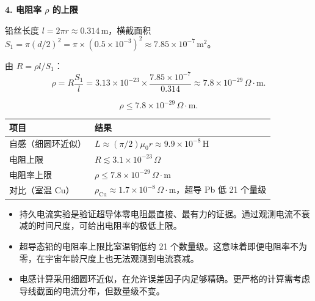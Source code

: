 \begin{derivationbox}[标准解题过程]
\textbf{4. 电阻率 $\rho$ 的上限}

铅丝长度 $l=2\pi r\approx0.314\,\text{m}$，横截面积 $S_1=\pi(d/2)^2=\pi\times(0.5\times10^{-3})^2\approx7.85\times10^{-7}\,\text{m}^2$。

由 $R=\rho l/S_1$：
\begin{equation}
\rho=R\frac{S_1}{l}=3.13\times10^{-23}\times\frac{7.85\times10^{-7}}{0.314}\approx7.8\times10^{-29}\,\Omega\cdot\text{m}.
\end{equation}

\begin{equation}
\boxed{\rho\le7.8\times10^{-29}\,\Omega\cdot\text{m}.}
\end{equation}
\end{derivationbox}

\begin{formulabox}[答案汇总]
\begin{center}
\begin{tabular}{ll}
\toprule
\textbf{项目} & \textbf{结果} \\
\midrule
自感（细圆环近似） & $L\approx(\pi/2)\mu_0r\approx9.9\times10^{-8}\,\text{H}$ \\
电阻上限 & $R\lesssim3.1\times10^{-23}\,\Omega$ \\
电阻率上限 & $\rho\le7.8\times10^{-29}\,\Omega\cdot\text{m}$ \\
对比（室温 Cu） & $\rho_{\text{Cu}}\approx1.7\times10^{-8}\,\Omega\cdot\text{m}$，超导 Pb 低 21 个量级 \\
\bottomrule
\end{tabular}
\end{center}
\end{formulabox}

\begin{insightbox}[物理图像]
\begin{itemize}
    \item 持久电流实验是验证超导体零电阻最直接、最有力的证据。通过观测电流不衰减的时间尺度，可给出电阻率的极低上限。
    \item 超导态铅的电阻率上限比室温铜低约 21 个数量级。这意味着即便电阻率不为零，在宇宙年龄尺度上也无法观测到电流衰减。
    \item 电感计算采用细圆环近似，在允许误差因子内足够精确。更严格的计算需考虑导线截面的电流分布，但数量级不变。
\end{itemize}
\end{insightbox}
